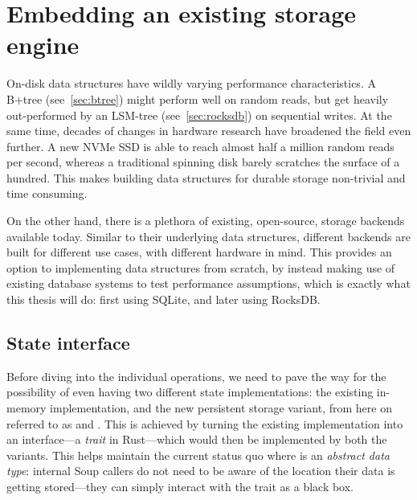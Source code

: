 \section{Embedding an existing storage engine}
On-disk data structures have wildly varying performance characteristics. A
B+tree (see~\ref{sec:btree}) might perform well on random reads, but get heavily
out-performed by an LSM-tree (see~\ref{sec:rocksdb}) on sequential writes. At
the same time, decades of changes in hardware research have broadened the field
even further. A new NVMe SSD is able to reach almost half a million random reads
per
second,
whereas a traditional spinning disk barely scratches the surface of a
hundred.
This makes building data structures for durable storage non-trivial and time
consuming.

On the other hand, there is a plethora of existing, open-source, storage
backends available today. Similar to their underlying data structures, different
backends are built for different use cases, with different hardware in mind.
This provides an option to implementing data structures from scratch, by instead
making use of existing database systems to test performance assumptions, which
is exactly what this thesis will do: first using SQLite, and later using
RocksDB.\@

\subsection{State interface}\label{sec:trait}
Before diving into the individual  operations, we need to pave the
way for the possibility of even having two different state implementations: the
existing in-memory implementation, and the new persistent storage variant, from
here on referred to as  and . This is
achieved by turning the existing  implementation into an
interface---a \textit{trait} in Rust---which would then be implemented by both
the  variants. This helps maintain the current status quo where
 is an \textit{abstract data type}: internal Soup callers do not
need to be aware of the location their data is getting stored---they can simply
interact with the  trait as a black box\@.

